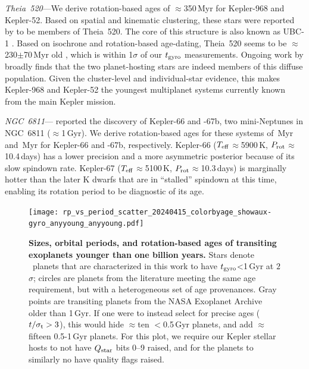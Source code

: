 \documentclass[11pt,twocolumn,tighten]{aastex63}
\begin{document}
{\it Theia~520}---We derive rotation-based ages of $\approx$350\,Myr
for Kepler-968 and Kepler-52.  Based on spatial and kinematic
clustering, these stars were reported by \citet{2019AJ....158..122K}
to be members of Theia~520.  The core of this
structure is also known as UBC-1 \citep{2018A&A...618A..59C}.  Based
on isochrone and rotation-based age-dating, Theia~520 seems to be
$\approx$230$\pm$70\,Myr old
\citep{2019AJ....158..122K,2024A&A...681A..13F}, which is within 
1$\sigma$ of our $t_{\rm gyro}$
measurements.  Ongoing work by \citet{Curtis2024} broadly finds that
the two planet-hosting stars are indeed members of this diffuse
population.  Given the cluster-level and individual-star evidence,
this makes Kepler-968 and Kepler-52 the youngest multiplanet systems
currently known from the main Kepler mission.

{\it NGC~6811}---\citet{Meibom_2013} reported the discovery of
Kepler-66 and -67b, two mini-Neptunes in NGC~6811 ($\approx$1\,Gyr).
We derive rotation-based ages for these systems of
\kepsixsixtgyro\,Myr and \kepsixseventgyro\,Myr for Kepler-66 and
-67b, respectively.  Kepler-66 ($T_{\rm eff}$$\approx$5900\,K, $P_{\rm
rot}$$\approx$10.4\,days) has a lower precision and a more asymmetric
posterior because of its slow spindown rate.  Kepler-67 ($T_{\rm
eff}$$\approx$5100\,K, $P_{\rm rot}$$\approx$10.3\,days) is marginally
hotter than the later K dwarfs that are in ``stalled'' spindown at
this time, enabling its rotation period to be diagnostic of its age.

\begin{figure}[!t]
  \begin{center}
    \texttt{[image: rp\_vs\_period\_scatter\_20240415\_colorbyage\_showaux-gyro\_anyyoung\_anyyoung.pdf]}
  \end{center}
  \vspace{-0.5cm}
  \caption{
    {\bf Sizes, orbital periods, and rotation-based ages of transiting
    exoplanets younger than one billion years.} Stars denote
    \nplyounggyrotwosigmanograzingnoruwe\ planets that are 
    characterized in this work to have $t_{\rm gyro}$<1\,Gyr at
    $2$$\sigma$; circles are planets from the literature meeting the
    same age requirement, but with a heterogeneous set of age
    provenances.  Gray points are transiting planets from the NASA
    Exoplanet Archive older than 1\,Gyr.  If one were to instead
    select for precise ages ($t/\sigma_{\rm t}>3$), this would hide
    $\approx$ten $<$0.5\,Gyr planets, and add $\approx$fifteen
    0.5-1\,Gyr planets.  For this plot, we require our Kepler stellar
		hosts to not have $Q_{\rm star}$ bits 0--9 raised, and for the planets 
		to similarly no have quality flags raised. 
    \label{fig:rp_period_age_results}
  }
\end{figure}
\end{document}
